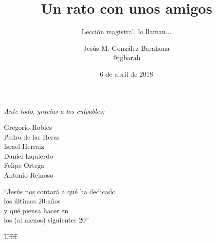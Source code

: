 \documentclass[17pt,aspectratio=169,hyperref=pdfusetitle]{beamer}
\title[Un rato con amigos]{Un rato con unos amigos}
\subtitle{Lección magistral, lo llaman...}
\author[Jesús M. González Barahona]{Jesús M. González Barahona \\
@jgbarah}
\institute[URJC]{Universidad Rey Juan Carlos \\
  \url{http://github.com/jgbarah/presentations}}
\date{6 de abril de 2018}
\begin{document}
\begin{frame}
  \maketitle
\end{frame}


\begin{frame}

  {\em
    Ante todo, gracias a los culpables:

    \begin{flushright}
    Gregorio Robles \\
    Pedro de las Heras \\
    Israel Herraiz \\
    Daniel Izquierdo \\
    Felipe Ortega \\
    Antonio Reinoso \\
    \end{flushright}
  }
\end{frame}

\begin{frame}

  {\em
    \begin{center}
      ``Jesús nos contará a qué ha dedicado \\
      los últimos 20 años \\
      y qué piensa hacer en \\
      los (al menos) siguientes 20''\\
    \end{center}
  }
\end{frame}

\begin{frame}

  {\em \Huge
    \begin{center}
      Uffff
    \end{center}
  }
\end{frame}


\frame{
\tableofcontents
}





\end{document}
